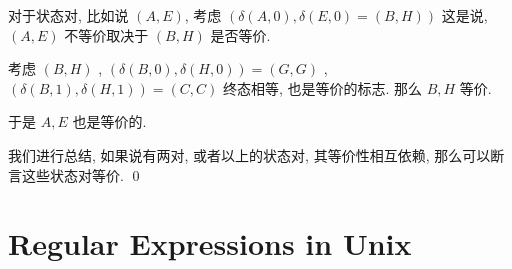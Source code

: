 \documentclass[../main_part1.tex]{subfiles}
\begin{document}
\begin{remark}
	对于状态对, 比如说 \((A , E)\), 考虑 \((\delta (A , 0) ,\delta (E, 0 ) = ( B , H) )\) 这是说, \( (A, E ) \) 不等价取决于 \((B, H) \) 是否等价. 

	考虑 \(( B,  H ) \) , \((\delta (B , 0 ) ,\delta (H , 0 ) ) = (G , G) \) , \( (\delta (B , 1 )  ,\delta (H , 1 ) ) = (C, C)\)
	终态相等, 也是等价的标志. 那么 \(B, H\) 等价. 

	于是 \(A, E\) 也是等价的. 

	我们进行总结, 如果说有两对, 或者以上的状态对, 其等价性相互依赖, 那么可以断言这些状态对等价.  \qed
\end{remark}

\section{Regular Expressions in Unix}
\label{sec:Regular Expressions in Unix}


\end{document}
